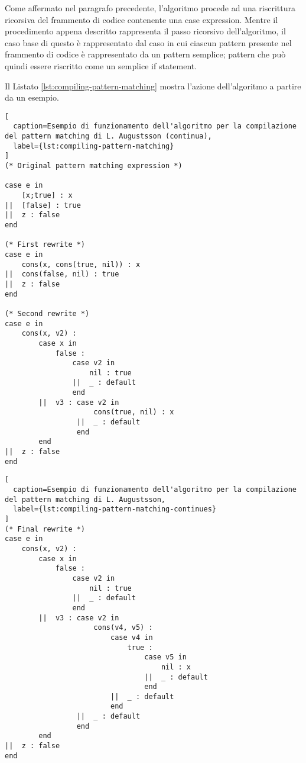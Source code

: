 Come affermato nel paragrafo precedente, l'algoritmo procede ad una riscrittura
ricorsiva del frammento di codice contenente una case expression. Mentre il
procedimento appena descritto rappresenta il passo ricorsivo dell'algoritmo, il
caso base di questo è rappresentato dal caso in cui ciascun pattern presente nel
frammento di codice è rappresentato da un pattern semplice; pattern che può
quindi essere riscritto come un semplice if statement.

Il Listato \ref{lst:compiling-pattern-matching} mostra l'azione dell'algoritmo a
partire da un esempio.

\newpage

\begin{lstlisting}[
  caption=Esempio di funzionamento dell'algoritmo per la compilazione del pattern matching di L. Augustsson (continua),
  label={lst:compiling-pattern-matching}
]
(* Original pattern matching expression *)

case e in
    [x;true] : x
||  [false] : true
||  z : false
end

(* First rewrite *)
case e in
    cons(x, cons(true, nil)) : x
||  cons(false, nil) : true
||  z : false
end

(* Second rewrite *)
case e in
    cons(x, v2) :
        case x in
            false :
                case v2 in
                    nil : true
                ||  _ : default
                end
        ||  v3 : case v2 in
                     cons(true, nil) : x
                 ||  _ : default
                 end
        end
||  z : false
end

\end{lstlisting}

\newpage

\begin{lstlisting}[
  caption=Esempio di funzionamento dell'algoritmo per la compilazione del pattern matching di L. Augustsson,
  label={lst:compiling-pattern-matching-continues}
]
(* Final rewrite *)
case e in
    cons(x, v2) :
        case x in
            false :
                case v2 in
                    nil : true
                ||  _ : default
                end
        ||  v3 : case v2 in
                     cons(v4, v5) :
                         case v4 in
                             true :
                                 case v5 in
                                     nil : x
                                 ||  _ : default
                                 end
                         ||  _ : default
                         end
                 ||  _ : default
                 end
        end
||  z : false
end
\end{lstlisting}

